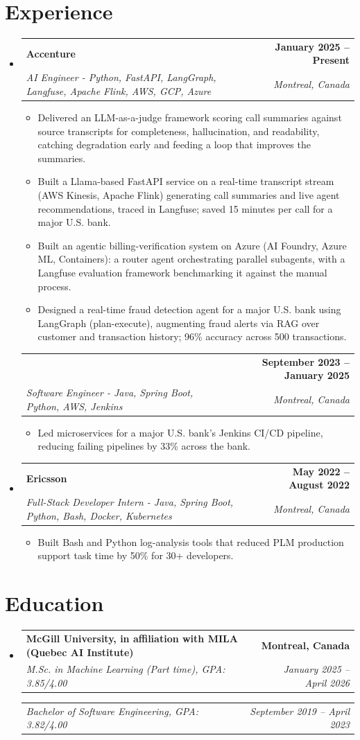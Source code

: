 \documentclass[letterpaper,11pt]{article}
\makeatletter
\newcommand{\resumeItem}[1]{
  \item\small{{#1 \vspace{-2pt}}}
}
\newcommand{\resumeSubheading}[4]{
  \vspace{-2pt}\item
    \begin{tabular*}{1.0\textwidth}[t]{l@{\extracolsep{\fill}}r}
      \textbf{#1} & \textbf{\small #2} \\
      \textit{\small#3} & \textit{\small #4} \\
    \end{tabular*}\vspace{-7pt}
}
\newcommand{\resumeSubheadingContinued}[3]{
  \vspace{4pt}
    \begin{tabular*}{1.0\textwidth}[t]{l@{\extracolsep{\fill}}r}
      & \textbf{\small #2} \\
      \textit{\small#1} & \textit{\small #3} \\
    \end{tabular*}\vspace{-7pt}
}
\newcommand{\resumeSubheadingDegree}[2]{
  \vspace{2pt}
    \begin{tabular*}{1.0\textwidth}[t]{l@{\extracolsep{\fill}}r}
      \textit{\small#1} & \textit{\small #2} \\
    \end{tabular*}\vspace{-7pt}
}
\newcommand{\resumeSubHeadingListStart}{\begin{itemize}[leftmargin=0.0in, label={}]}
\newcommand{\resumeSubHeadingListEnd}{\end{itemize}}
\newcommand{\resumeItemListStart}{\begin{itemize}}
\newcommand{\resumeItemListEnd}{\end{itemize}\vspace{-5pt}}
\makeatother
\begin{document}
\section{Experience}
  \resumeSubHeadingListStart

    \resumeSubheading
      {Accenture}{January 2025 -- Present}
      {AI Engineer - Python, FastAPI, LangGraph, Langfuse, Apache Flink, AWS, GCP, Azure}{Montreal, Canada}
      \resumeItemListStart
        \resumeItem{Delivered an LLM-as-a-judge framework scoring call summaries against source transcripts for completeness, hallucination, and readability, catching degradation early and feeding a loop that improves the summaries.}
        \resumeItem{Built a Llama-based FastAPI service on a real-time transcript stream (AWS Kinesis, Apache Flink) generating call summaries and live agent recommendations, traced in Langfuse; saved 15 minutes per call for a major U.S. bank.}
        \resumeItem{Built an agentic billing-verification system on Azure (AI Foundry, Azure ML, Containers): a router agent orchestrating parallel subagents, with a Langfuse evaluation framework benchmarking it against the manual process.}
        \resumeItem{Designed a real-time fraud detection agent for a major U.S. bank using LangGraph (plan-execute), augmenting fraud alerts via RAG over customer and transaction history; 96\% accuracy across 500 transactions.}
      \resumeItemListEnd
      \vspace{-8pt}

    \resumeSubheadingContinued
      {Software Engineer - Java, Spring Boot, Python, AWS, Jenkins}{September 2023 -- January 2025}{Montreal, Canada}
      \resumeItemListStart
        \resumeItem{Led microservices for a major U.S. bank's Jenkins CI/CD pipeline, reducing failing pipelines by 33\% across the bank.}
      \resumeItemListEnd

    \resumeSubheading
      {Ericsson}{May 2022 -- August 2022}
      {Full-Stack Developer Intern - Java, Spring Boot, Python, Bash, Docker, Kubernetes}{Montreal, Canada}
      \resumeItemListStart
        \resumeItem{Built Bash and Python log-analysis tools that reduced PLM production support task time by 50\% for 30+ developers.}
      \resumeItemListEnd

  \resumeSubHeadingListEnd
\vspace{-14pt}

\section{Education}
  \resumeSubHeadingListStart
    \resumeSubheading
      {McGill University, in affiliation with MILA (Quebec AI Institute)}{Montreal, Canada}
      {M.Sc. in Machine Learning (Part time), GPA: 3.85/4.00}{January 2025 -- April 2026}
    \vspace{1pt}
    \resumeSubheadingDegree{Bachelor of Software Engineering, GPA: 3.82/4.00}{September 2019 -- April 2023}
  \resumeSubHeadingListEnd
\vspace{-12pt}
\end{document}
